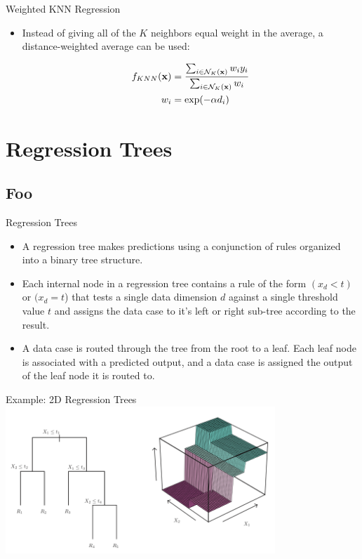 \documentclass[serif,xcolor=pdftex,dvipsnames,table,hyperref={bookmarks=false,breaklinks}]{beamer}
\begin{document}
\begin{frame}[t]{Weighted KNN Regression}

\begin{itemize}
\item Instead of giving all of the $K$ neighbors equal weight in the average, a distance-weighted average can be used:

\begin{align*}
f_{KNN}({\mathbf{x}}) &=\frac{\sum_{i\in \mathcal{N}_K({\mathbf{x}})} w_i y_i}
{\sum_{i\in \mathcal{N}_K({\mathbf{x}})} w_i}\\
w_i &= \exp(-\alpha d_i)
\end{align*}

\end{itemize}

\end{frame}


\section{Regression Trees}
\subsection{Foo}

\begin{frame}[t]{Regression Trees}
\center
\begin{itemize}
\item A regression tree makes predictions using a conjunction of rules organized into a binary tree structure.

\pause\item Each internal node in a regression tree contains a rule of the form $(x_d<t)$ or $(x_d=t$) that tests a single data dimension $d$ against a single threshold value $t$ and assigns the data case to it's left or right sub-tree according to the result.

\pause \item A data case is routed through the tree from the root to a leaf. Each leaf node is associated with a predicted output, and a data case is assigned the output of the leaf node it is routed to.

\end{itemize}

\end{frame}

\begin{frame}[t]{Example: 2D Regression Trees}
\center
\includegraphics[page=1,width=4in]{../Figures/2DTree-Example.png}
\end{frame}
\end{document}
